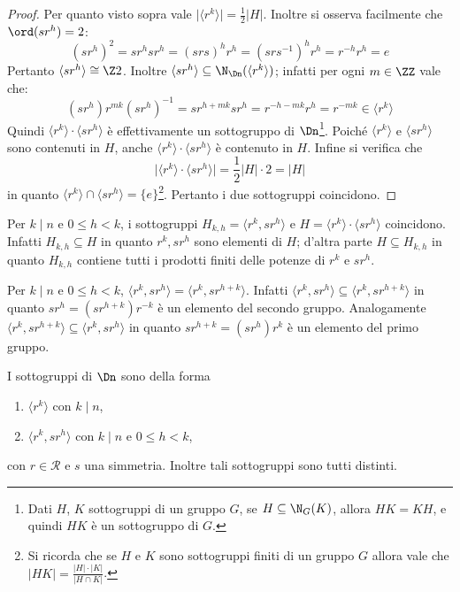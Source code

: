 \documentclass[11pt]{scrartcl}
\begin{document}
	\begin{proof}
		Per quanto visto sopra vale $\lvert \langle r^k\rangle \rvert = 
		\frac 1 2\lvert H\rvert$. Inoltre si osserva facilmente che $\ord(sr^h) = 2$:
		\[
		(sr^h)^2 = sr^hsr^h = (srs)^hr^h = (srs^{-1})^hr^h = r^{-h}r^h = e
		\]
		Pertanto $\langle sr^h\rangle \cong \Z2$. Inoltre $\langle sr^h\rangle
		\subseteq \N_{\Dn}(\langle r^k\rangle)$; infatti per ogni $m \in \ZZ$ vale che:
		\[
		(sr^h)r^{mk}(sr^h)^{-1} = sr^{h + mk} sr^h = r^{-h-mk}r^h = r^{-mk}
		\in \langle r^k \rangle
		\]
		Quindi
		$\langle r^k\rangle\cdot\langle sr^h\rangle$ è effettivamente
		un sottogruppo di $\Dn$\footnote
		{Dati $H$, $K$ sottogruppi
			di un gruppo $G$, se $H \subseteq \N_G(K)$,
			allora $HK = KH$, e quindi $HK$ è un sottogruppo di $G$.}.
		Poiché $\langle r^k\rangle$ e $\langle sr^h\rangle$ sono contenuti in $H$,
		anche $\langle r^k\rangle\cdot\langle sr^h\rangle$ è
		contenuto in $H$. Infine si verifica che
		\[\lvert \langle r^k\rangle\cdot\langle sr^h\rangle \rvert = \frac 1 2 \lvert H \rvert \cdot 2 = \lvert H \rvert \]
		in quanto $\langle r^k\rangle\cap\langle sr^h\rangle = \{e\}$\footnote{
			Si ricorda che se $H$ e $K$ sono sottogruppi finiti di un gruppo $G$ allora
			vale che $\lvert HK \rvert = \frac{\lvert H \rvert \cdot \lvert K \rvert}{\lvert H\cap K \rvert}$.
		}. Pertanto 
		i due sottogruppi coincidono.
	\end{proof}
	
	\begin{remark}
		Per $k \mid n$ e $0\leq h < k$, i sottogruppi $H_{k, h} = \langle r^k, sr^h\rangle$
		e $H = \langle r^k\rangle\cdot\langle sr^h\rangle$ coincidono. Infatti 
		$H_{k, h}\subseteq H$ in quanto $r^k, sr^h$ sono elementi di $H$; 
		d'altra parte $H \subseteq H_{k, h}$ in quanto $H_{k, h}$ contiene tutti i 
		prodotti finiti delle potenze di $r^k$ e $sr^h$.
	\end{remark}
	
	\begin{remark}
		Per $k \mid n$ e $0\leq h < k$, $\langle r^k, sr^h\rangle = 
		\langle r^k, sr^{h + k}\rangle$. Infatti $\langle r^k, sr^h\rangle \subseteq
		\langle r^k, sr^{h + k}\rangle$ in quanto $sr^h = (sr^{h + k})r^{-k}$ è
		un elemento del secondo gruppo. Analogamente $\langle r^k, sr^{h + k}\rangle
		\subseteq \langle r^k, sr^h\rangle$ in quanto $sr^{h + k} = (sr^h)r^k$ è un
		elemento del primo gruppo.
	\end{remark}
	
	\begin{theorem}
		I sottogruppi di $\Dn$ sono della forma \begin{enumerate}[(1)]
			\item $\langle r^k\rangle$ con $k\mid n$,
			\item $\langle r^k, sr^h\rangle$ con $k \mid n$ e $0\leq h < k$, 
		\end{enumerate}
		con $r \in \mathcal{R}$ e $s$ una simmetria. Inoltre tali sottogruppi sono
		tutti distinti.
	\end{theorem}
	
\end{document}
